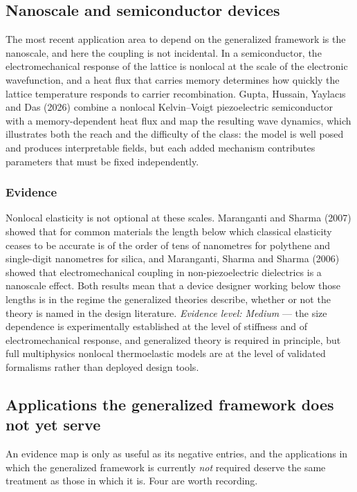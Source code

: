 \subsection{Nanoscale and semiconductor devices}
\label{sec:13.6}

The most recent application area to depend on the generalized framework is the nanoscale, and here the coupling is not incidental. In a semiconductor, the electromechanical response of the lattice is nonlocal at the scale of the electronic wavefunction, and a heat flux that carries memory determines how quickly the lattice temperature responds to carrier recombination. Gupta, Hussain, Yaylac{\i s} and Das (2026) \cite{Gupta2026HeatMap} combine a nonlocal Kelvin--Voigt piezoelectric semiconductor with a memory-dependent heat flux and map the resulting wave dynamics, which illustrates both the reach and the difficulty of the class: the model is well posed and produces interpretable fields, but each added mechanism contributes parameters that must be fixed independently.

\subsubsection{Evidence}
Nonlocal elasticity is not optional at these scales. Maranganti and Sharma (2007) \cite{Maranganti2007} showed that for common materials the length below which classical elasticity ceases to be accurate is of the order of tens of nanometres for polythene and single-digit nanometres for silica, and Maranganti, Sharma and Sharma (2006) \cite{Maranganti2006} showed that electromechanical coupling in non-piezoelectric dielectrics is a nanoscale effect. Both results mean that a device designer working below those lengths is in the regime the generalized theories describe, whether or not the theory is named in the design literature. \emph{Evidence level: Medium} --- the size dependence is experimentally established at the level of stiffness and of electromechanical response, and generalized theory is required in principle, but full multiphysics nonlocal thermoelastic models are at the level of validated formalisms rather than deployed design tools.

\subsection{Applications the generalized framework does not yet serve}
\label{sec:13.7}

An evidence map is only as useful as its negative entries, and the applications in which the generalized framework is currently \emph{not} required deserve the same treatment as those in which it is. Four are worth recording.

